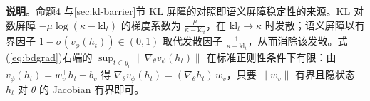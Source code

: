 \documentclass[lettersize,journal]{IEEEtran}
\begin{document}
\textbf{说明}。命题4 与\ref{sec:kl-barrier}节 KL 屏障的对照即语义屏障稳定性的来源。KL 对数屏障 $-\mu\log(\kappa - \mathrm{kl}_t)$ 的梯度系数为 $\frac{\mu}{\kappa - \mathrm{kl}_t}$，在 $\mathrm{kl}_t \to \kappa$ 时发散；语义屏障以有界因子 $1-\sigma(v_\phi(h_t)) \in (0,1)$ 取代发散因子 $\frac{1}{\kappa - \mathrm{kl}_t}$，从而消除该发散。式(\ref{eq:bdgrad})右端的 $\sup_{t \in y_r}\|\nabla_\theta v_\phi(h_t)\|$ 在标准正则性条件下有限：由 $v_\phi(h_t) = w_v^\top h_t + b_v$ 得 $\nabla_\theta v_\phi(h_t) = (\nabla_\theta h_t)\,w_v$，只要 $\|w_v\|$ 有界且隐状态 $h_t$ 对 $\theta$ 的 Jacobian 有界即可。














\vfill
\end{document}
